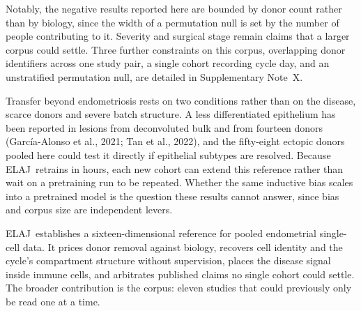 \documentclass[11pt]{article}
\newcommand{\elaj}{ELAJ\xspace}
\begin{document}
Notably, the negative results reported here are bounded by donor count rather 
than by biology, since the width of a permutation null is set by the number 
of people contributing to it. Severity and surgical stage remain claims that 
a larger corpus could settle. Three further constraints on this corpus, 
overlapping donor identifiers across one study pair, a single cohort 
recording cycle day, and an unstratified permutation null, are detailed 
in Supplementary Note~X.

Transfer beyond endometriosis rests on two conditions rather than on the
disease, scarce donors and severe batch structure. A less differentiated 
epithelium has been reported in lesions from deconvoluted bulk and from 
fourteen donors (García-Alonso et al., 2021; Tan et al., 2022), and 
the fifty-eight ectopic donors pooled here could test it directly if 
epithelial subtypes are resolved. Because \elaj\ retrains in hours, each 
new cohort can extend this reference rather than wait on a pretraining run 
to be repeated. Whether the same inductive bias scales into a pretrained 
model is the question these results cannot answer, since bias and corpus 
size are independent levers.

\elaj\ establishes a sixteen-dimensional reference for pooled endometrial
single-cell data. It prices donor removal against biology, recovers cell
identity and the cycle's compartment structure without supervision, places the
disease signal inside immune cells, and arbitrates published claims no single
cohort could settle. The broader contribution is the corpus: eleven studies 
that could previously only be read one at a time.
\end{document}
